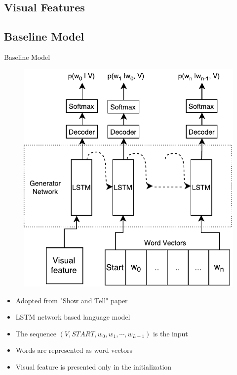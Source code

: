 \documentclass{beamer}
\begin{document}
\subsection{Visual Features}
\subsection{Baseline Model}
\begin{frame}{Baseline Model}
    \begin{figure}[h]
        \centering
        \includegraphics[width=0.4\linewidth]{images/Thesis_lstmLangGen.pdf}
    \end{figure}
    \begin{itemize}
        \item Adopted from "Show and Tell" paper~\cite{Vinyals_2015_CVPR} 
        \item LSTM network based language model
        \item The sequence $(V,START,w_0, w_1, \cdots,w_{L-1})$ is the input
        \item Words are represented as word vectors 
        \item Visual feature is presented only in the initialization 
    \end{itemize}
\end{frame}
\end{document}
